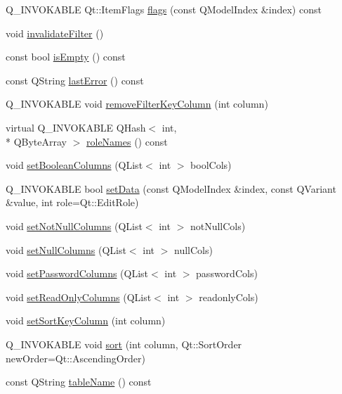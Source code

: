 \begin{DoxyCompactItemize}
\item 
Q\-\_\-\-I\-N\-V\-O\-K\-A\-B\-L\-E Qt\-::\-Item\-Flags \hyperlink{classSH__ExtendedProxyModel_a0fed636838c17a8a027a3d1968e5bcf0}{flags} (const Q\-Model\-Index \&index) const 
\item 
void \hyperlink{classSH__ExtendedProxyModel_a012a631fa5724bb8446bc5dce10be767}{invalidate\-Filter} ()
\item 
const bool \hyperlink{classSH__ExtendedProxyModel_a1f2183d82782002e73a6573702db030e}{is\-Empty} () const 
\item 
const Q\-String \hyperlink{classSH__ExtendedProxyModel_afb11fa89e1181d88843ea0f7fb3fe654}{last\-Error} () const 
\item 
Q\-\_\-\-I\-N\-V\-O\-K\-A\-B\-L\-E void \hyperlink{classSH__ExtendedProxyModel_a99c5fe8ea4e2327003a4810a1d869dac}{remove\-Filter\-Key\-Column} (int column)
\item 
virtual Q\-\_\-\-I\-N\-V\-O\-K\-A\-B\-L\-E Q\-Hash$<$ int, \\*
Q\-Byte\-Array $>$ \hyperlink{classSH__ExtendedProxyModel_ac7c8ce454ec81726c49ce12e9c4e7bba}{role\-Names} () const 
\item 
void \hyperlink{classSH__ExtendedProxyModel_ac9836a6109137161ef67d5da25e699fe}{set\-Boolean\-Columns} (Q\-List$<$ int $>$ bool\-Cols)
\item 
Q\-\_\-\-I\-N\-V\-O\-K\-A\-B\-L\-E bool \hyperlink{classSH__ExtendedProxyModel_af92835fcefa1917f9cab64307f6b95b8}{set\-Data} (const Q\-Model\-Index \&index, const Q\-Variant \&value, int role=Qt\-::\-Edit\-Role)
\item 
void \hyperlink{classSH__ExtendedProxyModel_aa198a2c1f4bfaae18d9e9dd8dce7e5cc}{set\-Not\-Null\-Columns} (Q\-List$<$ int $>$ not\-Null\-Cols)
\item 
void \hyperlink{classSH__ExtendedProxyModel_acf3e473b4ed806f9daf0ad6e32f0c3af}{set\-Null\-Columns} (Q\-List$<$ int $>$ null\-Cols)
\item 
void \hyperlink{classSH__ExtendedProxyModel_a79389378df6e07a2affb721216ac6961}{set\-Password\-Columns} (Q\-List$<$ int $>$ password\-Cols)
\item 
void \hyperlink{classSH__ExtendedProxyModel_ada56eb3eda9b0a1024d7b54e4f30ddb3}{set\-Read\-Only\-Columns} (Q\-List$<$ int $>$ readonly\-Cols)
\item 
void \hyperlink{classSH__ExtendedProxyModel_ad1eb97a28d23e9aba8174bd5ffd7a5e4}{set\-Sort\-Key\-Column} (int column)
\item 
Q\-\_\-\-I\-N\-V\-O\-K\-A\-B\-L\-E void \hyperlink{classSH__ExtendedProxyModel_a5ed9b14df78667efe8b22d19617d6c4b}{sort} (int column, Qt\-::\-Sort\-Order new\-Order=Qt\-::\-Ascending\-Order)
\item 
const Q\-String \hyperlink{classSH__ExtendedProxyModel_aba6e6f8bbde17ea533de3e9a127c804a}{table\-Name} () const 
\end{DoxyCompactItemize}
